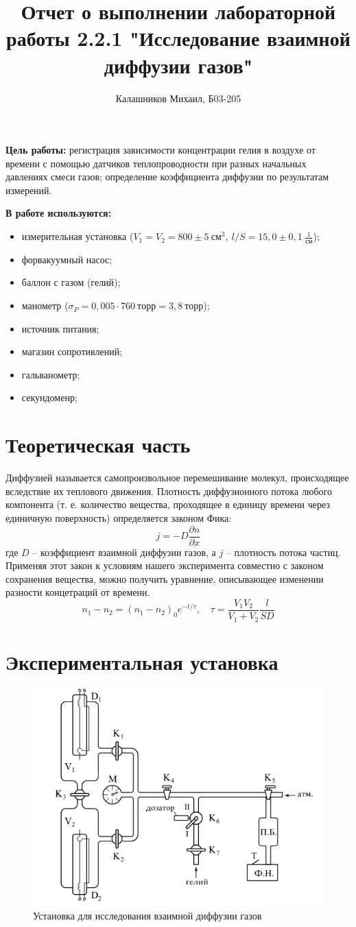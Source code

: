 \documentclass[14pt, a4paper]{report}
\title{\textbf{Отчет о выполнении лабораторной работы 2.2.1 "Исследование взаимной диффузии газов"}}
\author{Калашников Михаил, Б03-205}
\date{}
\begin{document}
\maketitle

\textbf{Цель работы:}
регистрация зависимости концентрации гелия в воздухе от времени с помощью датчиков теплопроводности при разных начальных давлениях смеси газов; определение коэффициента диффузии по результатам измерений.
\newline

\textbf{В работе используются:}
\begin{itemize}
\item измерительная установка ($V_1=V_2=800\pm5\ см^3,\ l/S=15,0\pm0,1\ \frac{1}{см}$);
\item форвакуумный насос;
\item баллон с газом (гелий);
\item манометр ($\sigma_P=0,005\cdot 760\ торр=3,8\ торр$);
\item источник питания;
\item магазин сопротивлений;
\item гальванометр;
\item секундоменр;
\end{itemize}

\section{Теоретическая часть}

Диффузией называется самопроизвольное перемешивание молекул, происходящее вследствие их теплового движения.
Плотность диффузионного потока любого компонента (т. е. количество вещества, проходящее в единицу времени через единичную поверхность) определяется законом Фика:
\[j=-D\frac{\partial n}{\partial x}\]
где $D$ -- коэффициент взаимной диффузии газов, а $j$ -- плотность потока частиц.
Применяя этот закон к условиям нашего эксперимента совместно с законом сохранения вещества, можно получить уравнение, описывающее изменении разности концетраций от времени.
\[n_1-n_2=(n_1-n_2)_0e^{-t/\tau},\quad\tau=\frac{V_1V_2}{V_1+V_2}\frac{l}{SD}\]

\section{Экспериментальная установка}

\begin{figure}[!ht]
\centering
\includegraphics[width=0.6\linewidth]{terma_4_1.png}
\caption{Установка для исследования взаимной диффузии газов}
\end{figure}
\end{document}
